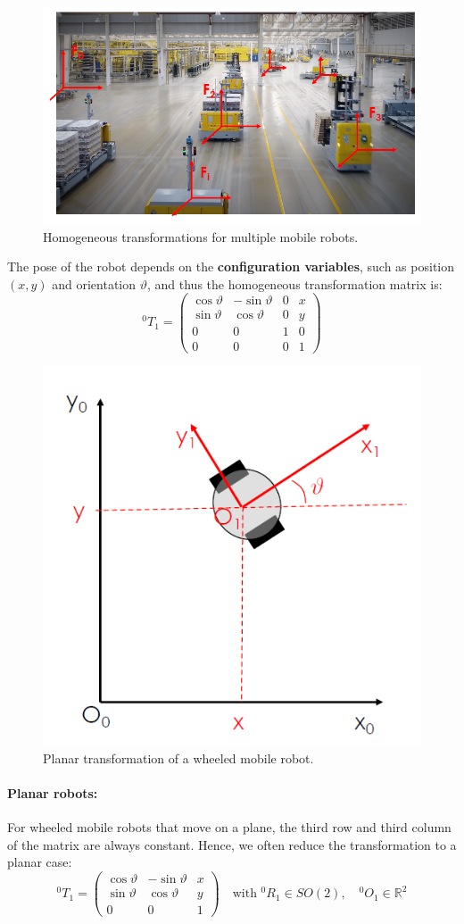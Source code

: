 \begin{figure}[H]
  \centering
  \includegraphics[width=0.75\linewidth]{imgs/homogeneous_robots_scene.png}
  \caption{Homogeneous transformations for multiple mobile robots.}
\end{figure}

The pose of the robot depends on the \textbf{configuration variables}, such as position $(x, y)$ and orientation $\vartheta$, and thus the homogeneous transformation matrix is:
\[
{}^0T_1 = \begin{pmatrix}
\cos\vartheta & -\sin\vartheta & 0 & x \\
\sin\vartheta & \cos\vartheta  & 0 & y \\
0 & 0 & 1 & 0 \\
0 & 0 & 0 & 1
\end{pmatrix}
\]

\begin{figure}[H]
  \centering
  \includegraphics[width=0.45\linewidth]{imgs/homogeneous_planar_robot.png}
  \caption{Planar transformation of a wheeled mobile robot.}
\end{figure}

\paragraph{Planar robots:}
For wheeled mobile robots that move on a plane, the third row and third column of the matrix are always constant. Hence, we often reduce the transformation to a planar case:
\[
{}^0T_1 = \begin{pmatrix}
\cos\vartheta & -\sin\vartheta & x \\
\sin\vartheta & \cos\vartheta & y \\
0 & 0 & 1
\end{pmatrix}
\quad\text{with } {}^0R_1 \in SO(2), \quad {}^0O_1 \in \mathbb{R}^2
\]

